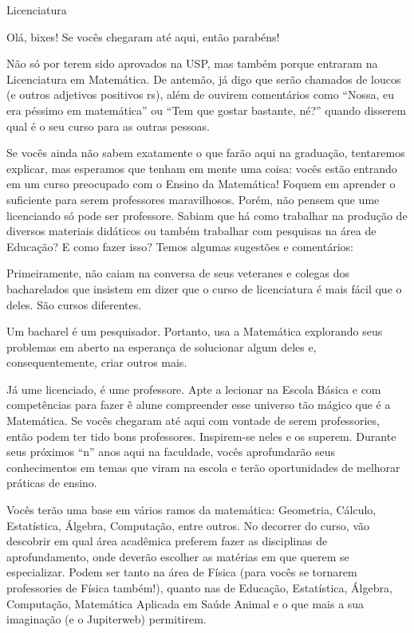 \begin{subsecao}{Licenciatura}

Olá, bixes! Se vocês chegaram até aqui, então parabéns!

Não só por terem sido aprovados na USP, mas também porque entraram na
Licenciatura em Matemática. De antemão, já digo que serão chamados de
loucos (e outros adjetivos positivos rs), além de ouvirem comentários como
``Nossa, eu era péssimo em matemática'' ou ``Tem que gostar bastante,
né?'' quando disserem qual é o seu curso para as outras pessoas.

Se vocês ainda não sabem exatamente o que farão aqui na graduação, tentaremos
explicar, mas esperamos que tenham em mente uma coisa: vocês estão entrando em um
curso preocupado com o Ensino da Matemática! Foquem em aprender o suficiente para 
serem professores maravilhosos. Porém, não pensem que ume licenciando só pode ser professore.
Sabiam que há como trabalhar na produção de diversos materiais didáticos ou também trabalhar
com pesquisas na área de Educação? E como fazer isso?  Temos algumas sugestões e comentários:

Primeiramente, não caiam na conversa de seus veteranes e colegas dos bacharelados
que insistem em dizer que o curso de licenciatura é mais fácil que o deles. São
cursos diferentes.

Um bacharel é um pesquisador. Portanto, usa a Matemática explorando seus
problemas em aberto na esperança de solucionar algum deles e, consequentemente,
criar outros mais.

Já ume licenciado, é ume professore. Apte a lecionar na Escola Básica e com
competências para fazer ê alune compreender esse universo tão mágico que é a
Matemática. Se vocês chegaram até aqui com vontade de serem professories, então
podem ter tido bons professores. Inspirem-se neles e os superem. Durante seus 
próximos ``n'' anos aqui na faculdade, vocês aprofundarão seus conhecimentos em 
temas que viram na escola e terão oportunidades de melhorar práticas de ensino.
 

Vocês terão uma base em vários ramos da matemática: Geometria, Cálculo,
Estatística, Álgebra, Computação, entre outros. No decorrer do curso, vão
descobrir em qual área acadêmica preferem fazer as disciplinas de
aprofundamento, onde deverão escolher as matérias em que querem se especializar.
Podem ser tanto na área de Física (para vocês se tornarem professories de Física
também!), quanto nas de Educação, Estatística, Álgebra, Computação, Matemática
Aplicada em Saúde Animal e o que mais a sua imaginação (e o Jupiterweb) permitirem.


\end{subsecao}
